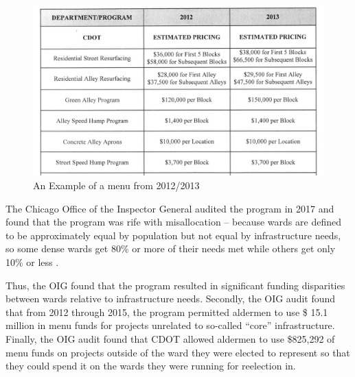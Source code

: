 \begin{figure}[H]
    \centering
    \caption{An Example of a menu from 2012/2013}\label{fig:menu_example}
    \includegraphics[scale=0.38]{input/menu_example.png}
\end{figure}

The Chicago Office of the Inspector General audited the program in 2017 and found that the program was rife with misallocation -- because wards are defined to be approximately equal by population but not equal by infrastructure needs, so some dense wards get 80\% or more of their needs met while others get only 10\% or less \citep{OIGaudit}.


Thus, the OIG found that the program resulted in significant funding disparities between wards relative to infrastructure needs.
Secondly, the OIG audit found that from 2012 through 2015, the program permitted aldermen to use \$ 15.1 million in menu funds for projects unrelated to so-called ``core'' infrastructure.
Finally, the OIG audit found that CDOT allowed aldermen to use \$825,292 of menu funds on projects outside of the ward they were elected to represent so that they could spend it on the wards they were running for reelection in.
